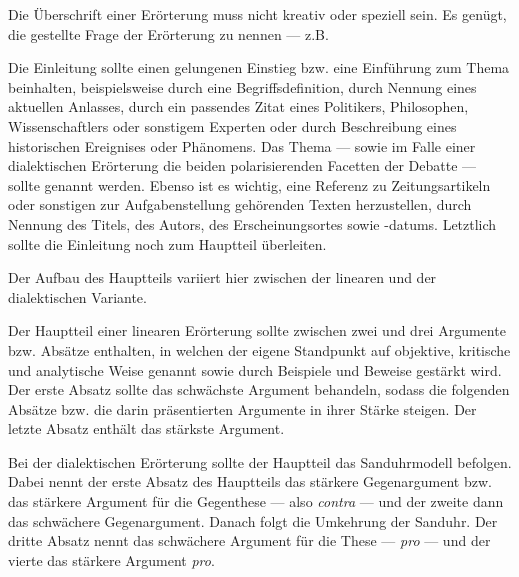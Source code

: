 \begin{enumerate}


	Die \"{U}berschrift einer Er\"{o}rterung muss nicht kreativ oder speziell sein. Es gen\"{u}gt, die gestellte Frage der Er\"{o}rterung zu nennen --- z.B. 


	Die Einleitung sollte einen gelungenen Einstieg bzw. eine Einf\"{u}hrung zum Thema beinhalten, beispielsweise durch eine Begriffsdefinition, durch Nennung eines aktuellen Anlasses, durch ein passendes Zitat eines Politikers, Philosophen, Wissenschaftlers oder sonstigem Experten oder durch Beschreibung eines historischen Ereignises oder Ph\"{a}nomens. Das Thema --- sowie im Falle einer dialektischen Er\"{o}rterung die beiden polarisierenden Facetten der Debatte --- sollte genannt werden. Ebenso ist es wichtig, eine Referenz zu Zeitungsartikeln oder sonstigen zur Aufgabenstellung geh\"{o}renden Texten herzustellen, durch Nennung des Titels, des Autors, des Erscheinungsortes sowie -datums. Letztlich sollte die Einleitung noch zum Hauptteil \"{u}berleiten.


	Der Aufbau des Hauptteils variiert hier zwischen der linearen und der dialektischen Variante. 

	\begin{itemize}


		Der Hauptteil einer linearen Er\"{o}rterung sollte zwischen zwei und drei Argumente bzw. Abs\"{a}tze enthalten, in welchen der eigene Standpunkt auf objektive, kritische und analytische Weise genannt sowie durch Beispiele und Beweise gest\"{a}rkt wird. Der erste Absatz sollte das schw\"{a}chste Argument behandeln, sodass die folgenden Abs\"{a}tze bzw. die darin pr\"{a}sentierten Argumente in ihrer St\"{a}rke steigen. Der letzte Absatz enth\"{a}lt das st\"{a}rkste Argument.


		Bei der dialektischen Er\"{o}rterung sollte der Hauptteil das Sanduhrmodell befolgen. Dabei nennt der erste Absatz des Hauptteils das st\"{a}rkere Gegenargument bzw. das st\"{a}rkere Argument f\"{u}r die Gegenthese --- also \emph{contra} --- und der zweite dann das schw\"{a}chere Gegenargument. Danach folgt die Umkehrung der Sanduhr. Der dritte Absatz nennt das schw\"{a}chere Argument f\"{u}r die These --- \emph{pro} --- und der vierte das st\"{a}rkere Argument \emph{pro}.


\end{itemize}
\end{enumerate}
